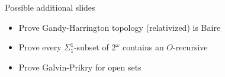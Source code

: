 \begin{frame}{Possible additional slides}
  \begin{itemize}
    \item Prove Gandy-Harrington topology (relativized) is Baire
    \item Prove every $\Sigma_1^1$-subset of $2^\omega$ contains an
      $O$-recursive
    \item Prove Galvin-Prikry for open sets
  \end{itemize}
\end{frame}
